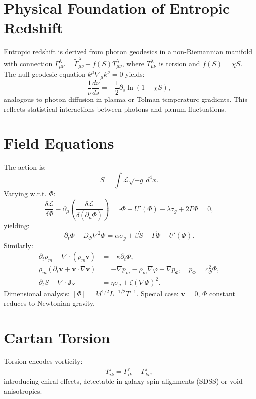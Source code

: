 \documentclass[11pt]{article}
\theoremstyle{plain}
\theoremstyle{definition}
\begin{document}
\section{Physical Foundation of Entropic Redshift}
Entropic redshift is derived from photon geodesics in a non-Riemannian manifold with connection $\Gamma^\lambda_{\mu\nu} = \tilde{\Gamma}^\lambda_{\mu\nu} + f(S) T^\lambda_{\mu\nu}$, where $T^\lambda_{\mu\nu}$ is torsion and $f(S) = \chi S$. The null geodesic equation $k^\mu \nabla_\mu k^\nu = 0$ yields:
\begin{equation}
\frac{1}{\nu} \frac{d\nu}{ds} = -\frac{1}{2} \partial_s \ln(1 + \chi S),
\label{eq:freq_shift}
\end{equation}
analogous to photon diffusion in plasma or Tolman temperature gradients. This reflects statistical interactions between photons and plenum fluctuations.

\section{Field Equations}
The action is:
\begin{equation}
S = \int \mathcal{L} \sqrt{-g} \, d^4x.
\end{equation}
Varying w.r.t. $\Phi$:
\[
\frac{\delta \mathcal{L}}{\delta \Phi} - \partial_\mu \left( \frac{\delta \mathcal{L}}{\delta (\partial_\mu \Phi)} \right) = \square \Phi + U'(\Phi) - \lambda \sigma_g + 2\Gamma \ddot{\Phi} = 0,
\]
yielding:
\begin{equation}
\partial_t \Phi - D_\Phi \nabla^2 \Phi = \alpha \sigma_g + \beta \dot{S} - \Gamma \dot{\Phi} - U'(\Phi).
\label{eq:phi-eq}
\end{equation}
Similarly:
\begin{align}
\partial_t \rho_m + \nabla \cdot (\rho_m \bm{v}) &= -\kappa \partial_t \Phi, \label{eq:budget} \\
\rho_m (\partial_t \bm{v} + \bm{v} \cdot \nabla \bm{v}) &= -\nabla p_m - \rho_m \nabla \varphi - \nabla p_\Phi, \quad p_\Phi = c_\Phi^2 \Phi, \label{eq:mom} \\
\partial_t S + \nabla \cdot \bm{J}_S &= \eta \sigma_g + \zeta (\nabla \Phi)^2. \label{eq:entropy}
\end{align}
Dimensional analysis: $[\Phi] = M^{1/2} L^{-1/2} T^{-1}$. Special case: $\bm{v} = 0$, $\Phi$ constant reduces to Newtonian gravity.

\section{Cartan Torsion}
Torsion encodes vorticity:
\begin{equation}
T^j_{ik} = \Gamma^j_{ik} - \Gamma^j_{ki},
\end{equation}
introducing chiral effects, detectable in galaxy spin alignments (SDSS) or void anisotropies.
\end{document}
